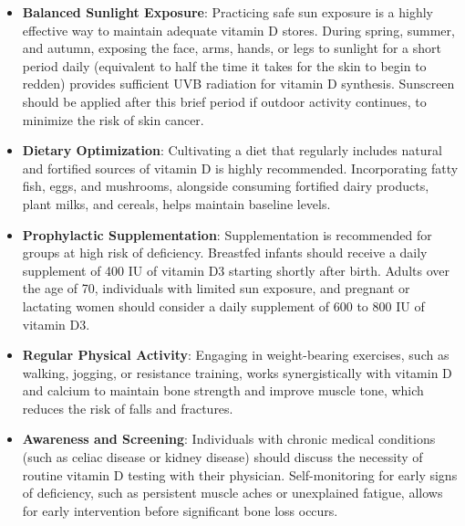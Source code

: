 \begin{itemize}
    \item \textbf{Balanced Sunlight Exposure}: Practicing safe sun exposure is a highly effective way to maintain adequate vitamin D stores. During spring, summer, and autumn, exposing the face, arms, hands, or legs to sunlight for a short period daily (equivalent to half the time it takes for the skin to begin to redden) provides sufficient UVB radiation for vitamin D synthesis. Sunscreen should be applied after this brief period if outdoor activity continues, to minimize the risk of skin cancer.
    \item \textbf{Dietary Optimization}: Cultivating a diet that regularly includes natural and fortified sources of vitamin D is highly recommended. Incorporating fatty fish, eggs, and mushrooms, alongside consuming fortified dairy products, plant milks, and cereals, helps maintain baseline levels.
    \item \textbf{Prophylactic Supplementation}: Supplementation is recommended for groups at high risk of deficiency. Breastfed infants should receive a daily supplement of 400 IU of vitamin D3 starting shortly after birth. Adults over the age of 70, individuals with limited sun exposure, and pregnant or lactating women should consider a daily supplement of 600 to 800 IU of vitamin D3.
    \item \textbf{Regular Physical Activity}: Engaging in weight-bearing exercises, such as walking, jogging, or resistance training, works synergistically with vitamin D and calcium to maintain bone strength and improve muscle tone, which reduces the risk of falls and fractures.
    \item \textbf{Awareness and Screening}: Individuals with chronic medical conditions (such as celiac disease or kidney disease) should discuss the necessity of routine vitamin D testing with their physician. Self-monitoring for early signs of deficiency, such as persistent muscle aches or unexplained fatigue, allows for early intervention before significant bone loss occurs.
\end{itemize}

